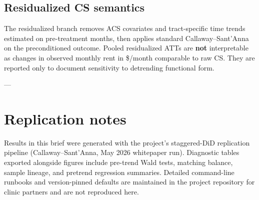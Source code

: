 \subsection{Residualized CS semantics}\label{app:residualized}

The residualized branch removes ACS covariates and tract-specific time trends estimated on pre-treatment months, then applies standard Callaway--Sant'Anna on the preconditioned outcome.
Pooled residualized ATTs are \textbf{not} interpretable as changes in observed monthly rent in \$/month comparable to raw CS.
They are reported only to document sensitivity to detrending functional form.

---

\section{Replication notes}\label{app:replication}

Results in this brief were generated with the project's staggered-DiD replication pipeline (Callaway--Sant'Anna, May 2026 whitepaper run).
Diagnostic tables exported alongside figures include pre-trend Wald tests, matching balance, sample lineage, and pretrend regression summaries.
Detailed command-line runbooks and version-pinned defaults are maintained in the project repository for clinic partners and are not reproduced here.
